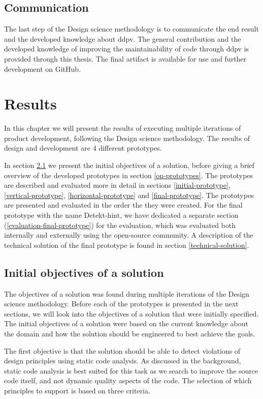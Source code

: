 \documentclass[pdftex,10pt,b5paper,twoside]{report}
\begin{document}
\section{Communication}
The last step of the Design science methodology is to communicate the end result and the developed knowledge about \gls{ddpv}. The general contribution and the developed knowledge of improving the maintainability of code through \gls{ddpv} is provided through this thesis. The final artifact is available for use and further development on GitHub\cite{detekt-hint-repository}.
\cleardoublepage


\chapter{Results}
\label{results}

In this chapter we will present the results of executing multiple iterations of product development, following the Design science methodology. The results of design and development are 4 different prototypes.

In section \ref{initial-os} we present the initial objectives of a solution, before giving a brief overview of the developed prototypes in section \ref{on-prototypes}. 
The prototypes are described and evaluated more in detail in sections \ref{initial-prototype}, \ref{vertical-prototype}, \ref{horizontal-prototype} and \ref{final-prototype}. The prototypes are presented and evaluated in the order the they were created. For the final prototype with the name Detekt-hint, we have dedicated a separate section (\ref{evaluation-final-prototype}) for the evaluation, which was evaluated both internally and externally using the open-source community. A description of the technical solution of the final prototype is found in section \ref{technical-solution}.

\section{Initial objectives of a solution}
\label{initial-os}
The objectives of a solution was found during multiple iterations of the Design science methodology. Before each of the prototypes is presented in the next sections, we will look into the objectives of a solution that were initially specified. The initial objectives of a solution were based on the current knowledge about the domain and how the solution should be engineered to best achieve the goals. 

The first objective is that the solution should be able to detect violations of design principles using static code analysis. As discussed in the background, static code analysis is best suited for this task as we search to improve the source code itself, and not dynamic quality aspects of the code. The selection of which principles to support is based on three criteria. 
\end{document}
